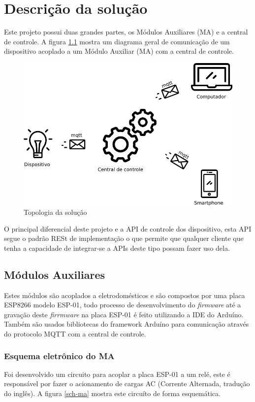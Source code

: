 \chapter{Descrição da solução}

Este projeto possui duas grandes partes, os Módulos Auxiliares (MA) e a central de controle. A figura \ref{dispositivos} mostra um diagrama geral de comunicação de um dispositivo acoplado a um Módulo Auxiliar (MA) com a central de controle.

\begin{figure}[H]
\caption{\label{dispositivos} Topologia da solução}
\includegraphics[scale=0.5]{img/arquitetura-basica-2.png}
\end{figure}

O principal diferencial deste projeto e a API de controle dos dispositivo, esta API segue o padrão RESt de implementação o que permite que qualquer cliente que tenha a capacidade de integrar-se a APIs deste tipo possam fazer uso dela.

\section{Módulos Auxiliares}
Estes módulos são acoplados a eletrodomésticos e são compostos por uma placa ESP8266 modelo ESP-01, todo processo de desenvolvimento do \textit{firmware} até a gravação deste \textit{firrmware} na placa ESP-01 é feito utilizando a IDE do Arduíno. Também são usados bibliotecas do framework Arduíno para comunicação através do protocolo MQTT com a central de controle.

\subsection{Esquema eletrônico do MA}
Foi desenvolvido um circuito para acoplar a placa ESP-01 a um relé, este é responsável por fazer o acionamento de cargas AC (Corrente Alternada, tradução do inglês). A figura \ref{sch-ma} mostra este circuíto de forma esquemática.

